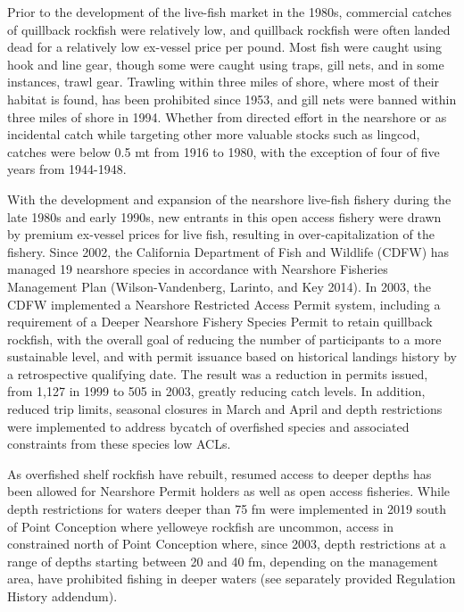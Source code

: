 \documentclass[11pt,
  english,
  a4paper,
]{article}
\begin{document}

Prior to the development of the live-fish market in the 1980s, commercial catches of quillback rockfish were relatively low, and quillback rockfish were often landed dead for a relatively low ex-vessel price per pound. Most fish were caught using hook and line gear, though some were caught using traps, gill nets, and in some instances, trawl gear. Trawling within three miles of shore, where most of their habitat is found, has been prohibited since 1953, and gill nets were banned within three miles of shore in 1994. Whether from directed effort in the nearshore or as incidental catch while targeting other more valuable stocks such as lingcod, catches were below 0.5 mt from 1916 to 1980, with the exception of four of five years from 1944-1948.

\leavevmode\tagmcend\tagstructend\par


With the development and expansion of the nearshore live-fish fishery during the late 1980s and early 1990s, new entrants in this open access fishery were drawn by premium ex-vessel prices for live fish, resulting in over-capitalization of the fishery. Since 2002, the California Department of Fish and Wildlife (CDFW) has managed 19 nearshore species in accordance with Nearshore Fisheries Management Plan {(Wilson-Vandenberg, Larinto, and Key 2014)\leavevmode\tagmcend\tagstructend}. In 2003, the CDFW implemented a Nearshore Restricted Access Permit system, including a requirement of a Deeper Nearshore Fishery Species Permit to retain quillback rockfish, with the overall goal of reducing the number of participants to a more sustainable level, and with permit issuance based on historical landings history by a retrospective qualifying date. The result was a reduction in permits issued, from 1,127 in 1999 to 505 in 2003, greatly reducing catch levels. In addition, reduced trip limits, seasonal closures in March and April and depth restrictions were implemented to address bycatch of overfished species and associated constraints from these species low ACLs.

\leavevmode\tagmcend\tagstructend\par


As overfished shelf rockfish have rebuilt, resumed access to deeper depths has been allowed for Nearshore Permit holders as well as open access fisheries. While depth restrictions for waters deeper than 75 fm were implemented in 2019 south of Point Conception where yelloweye rockfish are uncommon, access in constrained north of Point Conception where, since 2003, depth restrictions at a range of depths starting between 20 and 40 fm, depending on the management area, have prohibited fishing in deeper waters (see separately provided Regulation History addendum).
\end{document}
